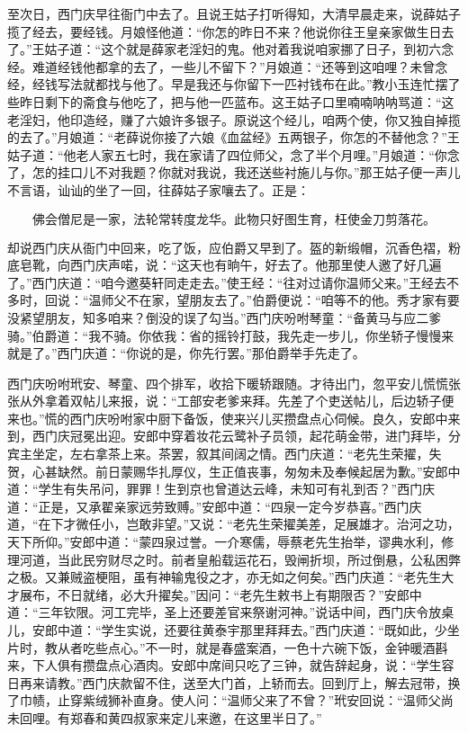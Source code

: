 至次日，西门庆早往衙门中去了。且说王姑子打听得知，大清早晨走来，说薛姑子揽了经去，要经钱。月娘怪他道：“你怎的昨日不来？他说你往王皇亲家做生日去了。”王姑子道：“这个就是薛家老淫妇的鬼。他对着我说咱家挪了日子，到初六念经。难道经钱他都拿的去了，一些儿不留下？”月娘道：“还等到这咱哩？未曾念经，经钱写法就都找与他了。早是我还与你留下一匹衬钱布在此。”教小玉连忙摆了些昨日剩下的斋食与他吃了，把与他一匹蓝布。这王姑子口里喃喃呐呐骂道：“这老淫妇，他印造经，赚了六娘许多银子。原说这个经儿，咱两个使，你又独自掉揽的去了。”月娘道：“老薛说你接了六娘《血盆经》五两银子，你怎的不替他念？”王姑子道：“他老人家五七时，我在家请了四位师父，念了半个月哩。”月娘道：“你念了，怎的挂口儿不对我题？你就对我说，我还送些衬施儿与你。”那王姑子便一声儿不言语，讪讪的坐了一回，往薛姑子家嚷去了。正是：

\[
佛会僧尼是一家，法轮常转度龙华。
此物只好图生育，枉使金刀剪落花。
\]

却说西门庆从衙门中回来，吃了饭，应伯爵又早到了。盔的新缎帽，沉香色褶，粉底皂靴，向西门庆声喏，说：“这天也有晌午，好去了。他那里使人邀了好几遍了。”西门庆道：“咱今邀葵轩同走走去。”使王经：“往对过请你温师父来。”王经去不多时，回说：“温师父不在家，望朋友去了。”伯爵便说：“咱等不的他。秀才家有要没紧望朋友，知多咱来？倒没的误了勾当。”西门庆吩咐琴童：“备黄马与应二爹骑。”伯爵道：“我不骑。你依我：省的摇铃打鼓，我先走一步儿，你坐轿子慢慢来就是了。”西门庆道：“你说的是，你先行罢。”那伯爵举手先走了。

西门庆吩咐玳安、琴童、四个排军，收拾下暖轿跟随。才待出门，忽平安儿慌慌张张从外拿着双帖儿来报，说：“工部安老爹来拜。先差了个吏送帖儿，后边轿子便来也。”慌的西门庆吩咐家中厨下备饭，使来兴儿买攒盘点心伺候。良久，安郎中来到，西门庆冠冕出迎。安郎中穿着妆花云鹭补子员领，起花萌金带，进门拜毕，分宾主坐定，左右拿茶上来。茶罢，叙其间阔之情。西门庆道：“老先生荣擢，失贺，心甚缺然。前日蒙赐华扎厚仪，生正值丧事，匆匆未及奉候起居为歉。”安郎中道：“学生有失吊问，罪罪！生到京也曾道达云峰，未知可有礼到否？”西门庆道：“正是，又承翟亲家远劳致赙。”安郎中道：“四泉一定今岁恭喜。”西门庆道，“在下才微任小，岂敢非望。”又说：“老先生荣擢美差，足展雄才。治河之功，天下所仰。”安郎中道：“蒙四泉过誉。一介寒儒，辱蔡老先生抬举，谬典水利，修理河道，当此民穷财尽之时。前者皇船载运花石，毁闸折坝，所过倒悬，公私困弊之极。又兼贼盗梗阻，虽有神输鬼役之才，亦无如之何矣。”西门庆道：“老先生大才展布，不日就绪，必大升擢矣。”因问：“老先生敕书上有期限否？”安郎中道：“三年钦限。河工完毕，圣上还要差官来祭谢河神。”说话中间，西门庆令放桌儿，安郎中道：“学生实说，还要往黄泰宇那里拜拜去。”西门庆道：“既如此，少坐片时，教从者吃些点心。”不一时，就是春盛案酒，一色十六碗下饭，金钟暖酒斟来，下人俱有攒盘点心酒肉。安郎中席间只吃了三钟，就告辞起身，说：“学生容日再来请教。”西门庆款留不住，送至大门首，上轿而去。回到厅上，解去冠带，换了巾帻，止穿紫绒狮补直身。使人问：“温师父来了不曾？”玳安回说：“温师父尚未回哩。有郑春和黄四叔家来定儿来邀，在这里半日了。”


